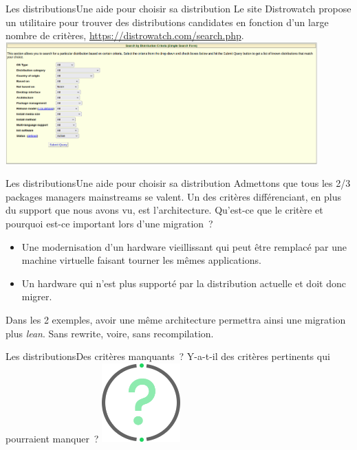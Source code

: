 \documentclass{beamer}
\begin{document}
    \begin{frame}{Les distributions}{Une aide pour choisir sa distribution}
        Le site Distrowatch propose un utilitaire pour trouver des distributions candidates en fonction d'un large nombre de critères, \url{https://distrowatch.com/search.php}.
        \bigbreak
        \centering
        \includegraphics[width=12cm]{image/distrowatch-search}
    \end{frame}

    \begin{frame}{Les distributions}{Une aide pour choisir sa distribution}
        Admettons que tous les 2/3 packages managers mainstreams se valent.
        \bigbreak
        Un des critères différenciant, en plus du support que nous avons vu, est l'architecture.
        \bigbreak
        Qu'est-ce que le critère  et pourquoi est-ce important lors d'une migration~?
        \pause
        \bigbreak
        \begin{itemize}
            \item Une modernisation d'un hardware vieillissant qui peut être remplacé par une machine virtuelle faisant tourner les mêmes applications.
            \item Un hardware qui n'est plus supporté par la distribution actuelle et doit donc migrer.
        \end{itemize}
        Dans les 2 exemples, avoir une même architecture permettra ainsi une migration plus \textit{lean}.
        Sans rewrite, voire, sans recompilation.
    \end{frame}

    \begin{frame}{Les distributions}{Des critères manquants~?}
        Y-a-t-il des critères pertinents qui pourraient manquer~?
        \bigbreak
        \centering
        \includegraphics[width=3cm]{image/question-mark}
    \end{frame}
\end{document}

